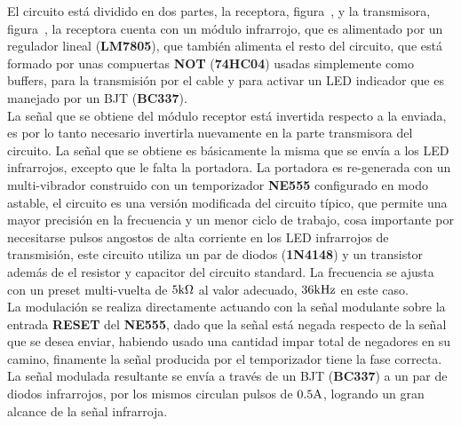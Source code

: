 
El circuito está dividido en dos partes, la receptora, figura~, y la transmisora, figura~, la receptora cuenta con un módulo infrarrojo, que es alimentado por un regulador lineal (\textbf{LM7805}), que también alimenta el resto del circuito, que está formado por unas compuertas \textbf{NOT} (\textbf{74HC04}) usadas simplemente como buffers, para la transmisión por el cable y para activar un LED indicador que es manejado por un BJT (\textbf{BC337}).\\

La señal que se obtiene del módulo receptor está invertida respecto a la enviada, es por lo tanto necesario invertirla nuevamente en la parte transmisora del circuito. La señal que se obtiene es básicamente la misma que se envía a los LED infrarrojos, excepto que le falta la portadora. La portadora es re-generada con un multi-vibrador construido con un temporizador \textbf{NE555} configurado en modo astable, el circuito es una versión modificada del circuito típico, que permite una mayor precisión en la frecuencia y un menor ciclo de trabajo, cosa importante por necesitarse pulsos angostos de alta corriente en los LED infrarrojos de transmisión, este circuito utiliza un par de diodos (\textbf{1N4148}) y un transistor además de el resistor y capacitor del circuito standard. La frecuencia se ajusta con un preset multi-vuelta de  $5 \si[per-mode=symbol]{\kilo\ohm}$ al valor adecuado,  $36 \si[per-mode=symbol]{\kilo\hertz}$ en este caso. \\

La modulación se realiza directamente actuando con la señal modulante sobre la entrada \textbf{RESET} del \textbf{NE555}, dado que la señal está negada respecto de la señal que se desea enviar, habiendo usado una cantidad impar total de negadores en su camino, finamente la señal producida por el temporizador tiene la fase correcta. La señal modulada resultante se envía a través de un BJT (\textbf{BC337}) a un par de diodos infrarrojos, por los mismos circulan pulsos de $0.5 \si[per-mode=symbol]{\ampere}$, logrando un gran alcance de la señal infrarroja.


\clearpage

